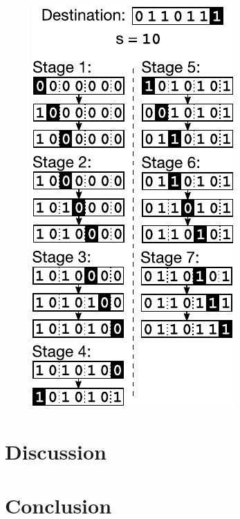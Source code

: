 \documentclass[twocolumn]{article}
\begin{document}
\begin{figure}
\begin{center}
\includegraphics{fig-routing.pdf}
\end{center}
\caption{
\label{fig:routing}
}
\end{figure}

\section{Discussion}

\section{Conclusion}



\end{document}
